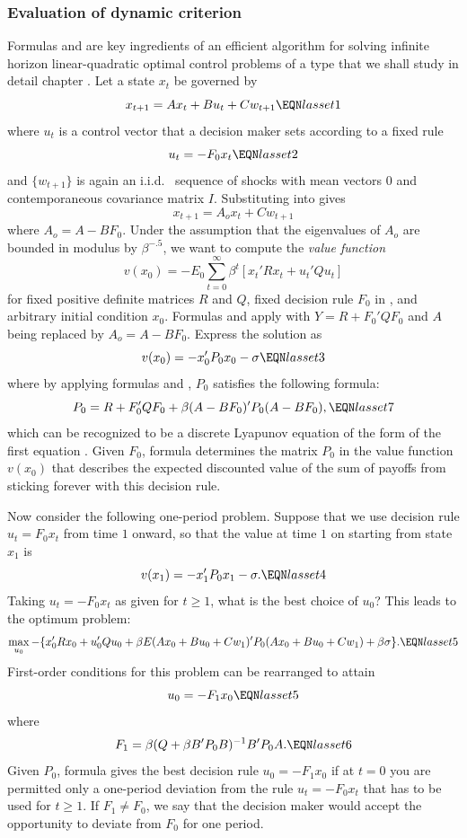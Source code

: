 \subsubsection{Evaluation of dynamic criterion}\label{sec:Howard1}%
Formulas  and  are key ingredients of an efficient algorithm for solving 
infinite horizon linear-quadratic optimal control problems of a type that we shall study in detail chapter .
 Let a state $x_t$ be governed by
$$ x_{t+1} = A x_t + B u_t + C w_{t+1} \EQN lasset1  $$
where $u_t$ is a control vector that  a decision maker sets according to
a fixed rule
$$ u_t = - F_0 x_t \EQN lasset2 $$
and $\{w_{t+1}\}$ is again an i.i.d.~ sequence of shocks with mean vectors $0$ and contemporaneous covariance matrix $I$.
Substituting  into  gives
$$ x_{t+1} = A_o x_t + C w_{t+1} $$
where
$A_o = A - BF_0$. Under the assumption that the eigenvalues of $A_o$ are bounded in
modulus by $\beta^{-.5}$, we want to compute the  {\it value function\/}
%
$$  v(x_0) = - E_0 \sum_{t=0}^\infty \beta^t [x_t' R x_t + u_t' Q u_t] $$
for fixed positive definite matrices $R$ and $Q$,  fixed decision rule $F_0$ in ,
and arbitrary initial condition $x_0$.
Formulas   and  apply with
$Y = R + F_0' Q F_0$ and $A$ being replaced by $A_o=A-BF_0$.
Express the solution as
$$ v(x_0) = - x_0' P_0 x_0 - \sigma  \EQN lasset3 $$
where by applying formulas 
and , $P_0$ satisfies  the following formula:
$$ P_0 = R + F_0'QF_0 + \beta (A -BF_0)' P_0 (A-BF_0), \EQN lasset7 $$
which can be recognized to be a discrete Lyapunov equation of the form
of the first equation .
Given $F_0$, formula  determines the matrix $P_0$ in the
value function $v(x_0)$ that describes the expected discounted value of the sum
of payoffs from
sticking forever with this decision rule.


Now consider the following one-period problem.  Suppose that
we  use decision rule $u_t = F_0 x_t$ from time $1$ onward,  so that
the value at time $1$ on starting from state $x_1$ is
$$ v(x_1) = - x_1' P_0 x_1 - \sigma. \EQN lasset4 $$
Taking $u_t= - F_0 x_t$ as given for $t \geq 1$,
what is the best choice of $u_0$?  This   leads
to the optimum problem:
$$ \max_{u_0} - \{x_0' R x_0 + u_0' Q u_0
  + \beta E(A x_0 + B u_0 + C w_1)' P_0 (A x_0 + B u_0 + C w_1)
  + \beta \sigma\}. \EQN lasset5 $$
First-order conditions for this problem can be rearranged to attain
$$ u_0 = - F_1 x_0 \EQN lasset5 $$
where $$ F_1 = \beta(Q + \beta B' P_0 B)^{-1} B' P_0 A.
 \EQN lasset6 $$
 Given $P_0$, formula
 gives the best decision rule $u_0 = - F_1
x_0$ if at $t=0$ you are permitted only a one-period deviation from the
rule $u_t = - F_0 x_t$ that has to be used  for $t \geq 1$.   If $F_1 \neq F_0$, we say that the decision
maker would accept the opportunity to deviate from $F_0$ for one period.

